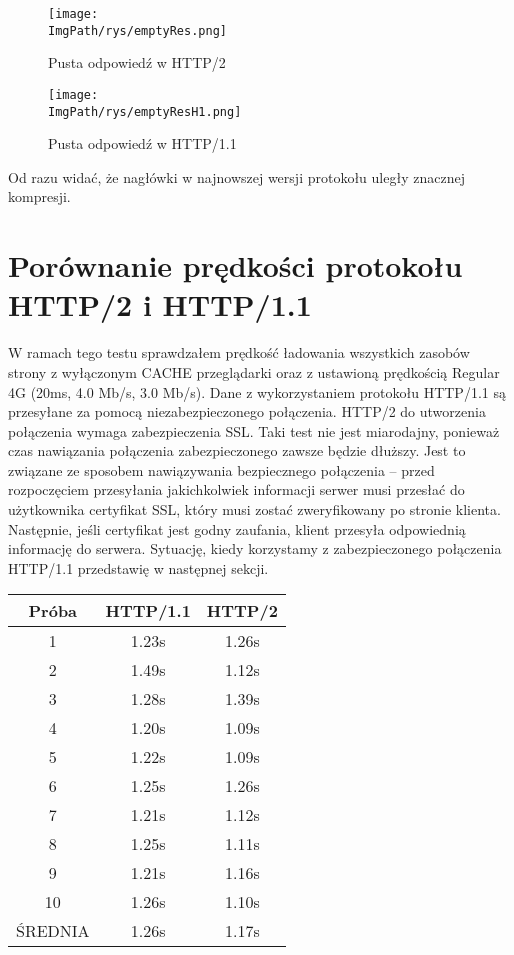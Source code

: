 \documentclass[a4paper,12pt,twoside,openany]{report}
\newcommand{\ImgPath}{.}
\begin{document}
\begin{figure}[!htbp]
	\begin{center}
\centering
\texttt{[image: \\ImgPath/rys/emptyRes.png]}
\end{center}
	\caption{Pusta odpowiedź w HTTP/2}
	\label{schematEmptyRes}
\end{figure}

\begin{figure}[!htbp]
	\begin{center}
\centering
\texttt{[image: \\ImgPath/rys/emptyResH1.png]}
\end{center}
	\caption{Pusta odpowiedź w HTTP/1.1}
	\label{schematEmptyResH1}
\end{figure}

Od razu widać, że nagłówki w najnowszej wersji protokołu uległy znacznej kompresji. 

\section{Porównanie prędkości protokołu HTTP/2 i HTTP/1.1}

W ramach tego testu sprawdzałem prędkość ładowania wszystkich zasobów strony z wyłączonym CACHE przeglądarki oraz z ustawioną prędkością Regular 4G (20ms, 4.0 Mb/s, 3.0 Mb/s).
Dane z wykorzystaniem protokołu HTTP/1.1 są przesyłane za pomocą niezabezpieczonego połączenia.
HTTP/2 do utworzenia połączenia wymaga zabezpieczenia SSL.
Taki test nie jest miarodajny, ponieważ czas nawiązania połączenia zabezpieczonego zawsze będzie dłuższy.
Jest to związane ze sposobem nawiązywania bezpiecznego połączenia -- przed rozpoczęciem przesyłania jakichkolwiek informacji serwer musi przesłać do użytkownika certyfikat SSL, który musi zostać zweryfikowany po stronie klienta.
Następnie, jeśli certyfikat jest godny zaufania, klient przesyła odpowiednią informację do serwera.
Sytuację, kiedy korzystamy z zabezpieczonego połączenia HTTP/1.1 przedstawię w następnej sekcji.

\begin{tabular}{c|c|c}
Próba & HTTP/1.1 & HTTP/2 \\ \hline
1 & 1.23s & 1.26s\\
2 & 1.49s & 1.12s\\
3 & 1.28s & 1.39s\\
4 & 1.20s & 1.09s\\
5 & 1.22s & 1.09s\\
6 & 1.25s & 1.26s\\
7 & 1.21s & 1.12s\\
8 & 1.25s & 1.11s\\
9 & 1.21s & 1.16s\\
10 & 1.26s & 1.10s\\ \hline
ŚREDNIA & 1.26s & 1.17s\\
\end{tabular}
\end{document}
